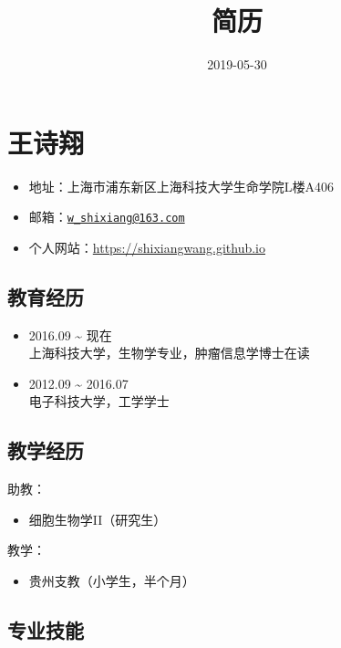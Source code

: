 \documentclass[10pt,]{article}
\title{简历}
\date{2019-05-30}
\providecommand{\tightlist}{%
  \setlength{\itemsep}{0pt}\setlength{\parskip}{0pt}}
\begin{document}

\section{王诗翔}

\begin{itemize}
\tightlist
\item
  地址：上海市浦东新区上海科技大学生命学院L楼A406
\item
  邮箱：\href{mailto:w_shixiang@163.com}{\nolinkurl{w\_shixiang@163.com}}
\item
  个人网站：\url{https://shixiangwang.github.io}
\end{itemize}

\subsection{教育经历}

\begin{itemize}
\item
  2016.09 \textasciitilde{} 现在 \\
  上海科技大学，生物学专业，肿瘤信息学博士在读
\item
  2012.09 \textasciitilde{} 2016.07 \\
  电子科技大学，工学学士
\end{itemize}

\subsection{教学经历}

助教：

\begin{itemize}
\tightlist
\item
  细胞生物学II（研究生）
\end{itemize}

教学：

\begin{itemize}
\tightlist
\item
  贵州支教（小学生，半个月）
\end{itemize}

\subsection{专业技能}
\end{document}
